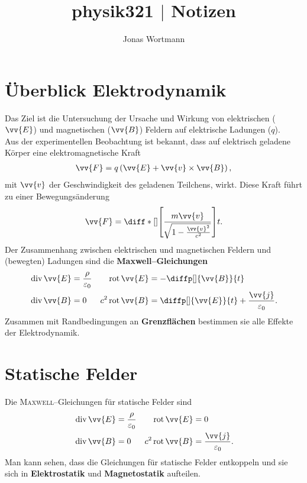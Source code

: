 \documentclass[a4paper,12pt]{article}
\numberwithin{equation}{section}
\begin{document}

\title{physik321 $|$ Notizen}
\author{Jonas Wortmann}
\maketitle
{}


\newpage


\fancyhead[L]{\thepage}
\fancyfoot[C]{}

\tableofcontents


\newpage


\fancyhead[R]{\leftmark\\\rightmark}

\section{Überblick Elektrodynamik}
Das Ziel ist die Untersuchung der Ursache und Wirkung von elektrischen ($\vv{E}$) und magnetischen ($\vv{B}$) Feldern auf elektrische Ladungen ($q$).\\\indent
Aus der experimentellen Beobachtung ist bekannt, dass auf elektrisch geladene Körper eine elektromagnetische Kraft 
\begin{align} 
        \vv{F}=q\left(\vv{E}+\vv{v}\times \vv{B}\right)
,\end{align} 
mit $\vv{v}$ der Geschwindigkeit des geladenen Teilchens, wirkt. Diese Kraft führt zu einer Bewegungsänderung
\begin{align} 
        \vv{F}=\diff*[]{\left[\dfrac{m\vv{v}}{\,\sqrt[]{1-\tfrac{\vv{v}^2}{c^2}} }\right]}{t}
.\end{align} 
Der Zusammenhang zwischen elektrischen und magnetischen Feldern und (bewegten) Ladungen sind die \textbf{Maxwell--Gleichungen}
\begin{align} 
        \,\text{div}\,\vv{E}&=\dfrac{\rho }{\varepsilon _0}&\,\text{rot}\,\vv{E}&=-\diffp[]{\vv{B}}{t}\\
        \,\text{div}\,\vv{B}&=0&c^2\,\text{rot}\,\vv{B}&=\diffp[]{\vv{E}}{t}+\dfrac{\vv{j}}{\varepsilon _0}
.\end{align} 
Zusammen mit Randbedingungen an \textbf{Grenzflächen} bestimmen sie alle Effekte der Elektrodynamik.

\newpage
\section{Statische Felder}
Die \textsc{Maxwell}--Gleichungen für statische Felder sind
\begin{align} 
        \,\text{div}\,\vv{E}&=\dfrac{\rho }{\varepsilon _0}&\,\text{rot}\,\vv{E}&=0\\
        \,\text{div}\,\vv{B}&=0&c^2\,\text{rot}\,\vv{B}&=\dfrac{\vv{j}}{\varepsilon _0}
.\end{align} 
Man kann sehen, dass die Gleichungen für statische Felder entkoppeln und sie sich in \textbf{Elektrostatik} und \textbf{Magnetostatik} aufteilen.
\end{document}
